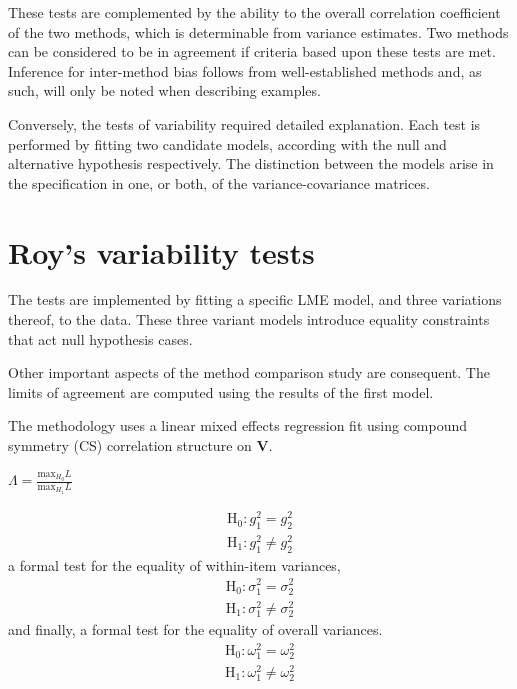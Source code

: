 \documentclass[12pt, a4paper]{report}
\theoremstyle{plain}
\theoremstyle{definition}
\theoremstyle{remark}
\begin{document}
These tests are complemented by the ability to the overall correlation coefficient of the two methods, which is determinable from variance estimates. Two methods can be considered to be in agreement if criteria based upon these tests are met. Inference for inter-method bias follows from well-established methods and, as such, will only be noted when describing examples.


Conversely, the tests of variability required detailed explanation. Each test is performed by fitting two candidate models, according with the null and alternative hypothesis respectively. The distinction between the models arise in the specification in one, or both, of the variance-covariance matrices. %

	\section{Roy's variability tests}
	
	
	The tests are implemented by fitting a specific LME model, and three variations thereof, to the data. These three variant models introduce equality constraints that act null hypothesis cases.
	
	Other important aspects of the method comparison study are consequent. The limits of agreement are computed using the results of the first model.
	
	
	
	
	The methodology uses a linear mixed effects regression fit using
	compound symmetry (CS) correlation structure on \textbf{V}.
	
	
	$\Lambda = \frac{\mbox{max}_{H_{0}}L}{\mbox{max}_{H_{1}}L}$
	
	
	
	
	\begin{eqnarray*}
		\operatorname{H_0} : g^2_1 = g^2_2 \\
		\operatorname{H_1} : g^2_1 \neq g^2_2
	\end{eqnarray*}
	a formal test for the equality of within-item variances,
	\begin{eqnarray*}
		\operatorname{H_0} : \sigma^2_1 = \sigma^2_2 \\
		\operatorname{H_1} : \sigma^2_1 \neq \sigma^2_2
	\end{eqnarray*}
	and finally, a formal test for the equality of overall variances.
	\begin{eqnarray*}
		\operatorname{H_0} : \omega^2_1 = \omega^2_2 \\
		\operatorname{H_1} : \omega^2_1 \neq \omega^2_2
	\end{eqnarray*}
	
\end{document}
